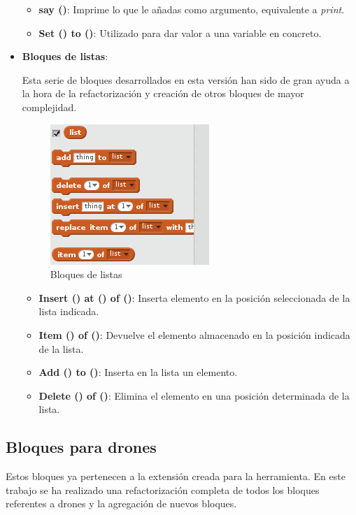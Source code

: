 \begin{itemize}
\begin{itemize}
\item \textbf{say ()}: Imprime lo que le añadas como argumento, equivalente a \textit{print}.
\item \textbf{Set () to ()}: Utilizado para dar valor a una variable en concreto.
\end{itemize}

\item \textbf{Bloques de listas}:

Esta serie de bloques desarrollados en esta versión han sido de gran ayuda a la hora de la refactorización y creación de otros bloques de mayor complejidad.

\begin{figure}[H]
     	\centering
     	\includegraphics[scale=0.60]{img/bloques-listas.png}
     	\caption{Bloques de listas}
  	\label{fig:listas}
\end{figure}

\begin{itemize}
\item \textbf{Insert () at () of ()}: Inserta elemento en la posición seleccionada de la lista indicada.
\item \textbf{Item () of ()}: Devuelve el elemento almacenado en la posición indicada de la lista.
\item \textbf{Add () to ()}: Inserta en la lista un elemento.
\item \textbf{Delete () of ()}: Elimina el elemento en una posición determinada de la lista.
\end{itemize}
\end{itemize}

\subsection{Bloques para drones}
Estos bloques ya pertenecen a la extensión creada para la herramienta.
En este trabajo se ha realizado una refactorización completa de todos los bloques referentes a drones y la agregación de nuevos bloques. 

